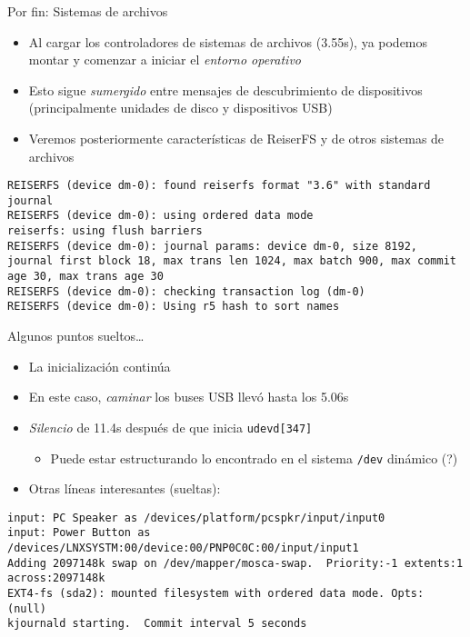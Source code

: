 \documentclass[presentation]{beamer}
\begin{document}
\begin{frame}[label={sec:orgd5812f2},fragile]{Por fin: Sistemas de archivos}
 \begin{itemize}
\item Al cargar los controladores de sistemas de archivos (3.55s), ya
podemos montar y comenzar a iniciar el \emph{entorno operativo}
\item Esto sigue \emph{sumergido} entre mensajes de descubrimiento de
dispositivos (principalmente unidades de disco y dispositivos USB)
\item Veremos posteriormente características de ReiserFS y de otros
sistemas de archivos
\end{itemize}
\begin{verbatim}
REISERFS (device dm-0): found reiserfs format "3.6" with standard journal
REISERFS (device dm-0): using ordered data mode
reiserfs: using flush barriers
REISERFS (device dm-0): journal params: device dm-0, size 8192, journal first block 18, max trans len 1024, max batch 900, max commit age 30, max trans age 30
REISERFS (device dm-0): checking transaction log (dm-0)
REISERFS (device dm-0): Using r5 hash to sort names
\end{verbatim}
\end{frame}

\begin{frame}[label={sec:org7614bc8},fragile]{Algunos puntos sueltos\ldots{}}
 \begin{itemize}
\item La inicialización continúa
\item En este caso, \emph{caminar} los buses USB llevó hasta los 5.06s
\item \emph{Silencio} de 11.4s después de que inicia \texttt{udevd[347]}
\begin{itemize}
\item Puede estar estructurando lo encontrado en el sistema \texttt{/dev}
dinámico (?)
\end{itemize}
\item Otras líneas interesantes (sueltas):
\end{itemize}
\begin{verbatim}
input: PC Speaker as /devices/platform/pcspkr/input/input0
input: Power Button as /devices/LNXSYSTM:00/device:00/PNP0C0C:00/input/input1
Adding 2097148k swap on /dev/mapper/mosca-swap.  Priority:-1 extents:1 across:2097148k
EXT4-fs (sda2): mounted filesystem with ordered data mode. Opts: (null)
kjournald starting.  Commit interval 5 seconds
\end{verbatim}
\end{frame}
\end{document}
